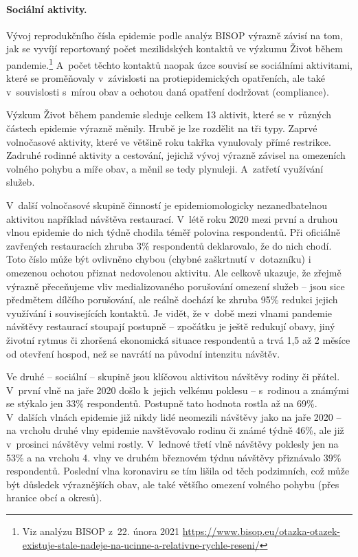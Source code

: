 \label{Socialni_aktivity}

\paragraph{Sociální aktivity.} Vývoj reprodukčního čísla epidemie podle analýz BISOP výrazně závisí na tom, jak se vyvíjí reportovaný počet mezilidských kontaktů ve výzkumu Život během pandemie.\footnote{Viz analýzu BISOP z 22. února 2021
\url{https://www.bisop.eu/otazka-otazek-existuje-stale-nadeje-na-ucinne-a-relativne-rychle-reseni/}} A~počet těchto kontaktů naopak úzce souvisí se sociálními aktivitami, které se proměňovaly v závislosti na protiepidemických opatřeních, ale také v~souvislosti s~mírou obav a ochotou daná opatření dodržovat (compliance).

Výzkum Život během pandemie sleduje celkem 13 aktivit, které se v~různých částech epidemie výrazně měnily. Hrubě je lze rozdělit na tři typy. Zaprvé volnočasové aktivity, které ve většině roku takřka vynulovaly přímé restrikce. Zadruhé rodinné aktivity a cestování, jejichž vývoj výrazně závisel na omezeních volného pohybu a míře obav, a měnil se tedy plynuleji. A~zatřetí využívání služeb.

V~další volnočasové skupině činností je epidemiomologicky nezanedbatelnou aktivitou například návštěva restaurací. V~létě roku 2020 mezi první a druhou vlnou epidemie do nich týdně chodila téměř polovina respondentů. Při oficiálně zavřených restauracích zhruba 3\% respondentů deklarovalo, že do nich chodí. Toto číslo může být ovlivněno chybou (chybné zaškrtnutí v~dotazníku) i omezenou ochotou přiznat nedovolenou aktivitu. Ale celkově ukazuje, že zřejmě výrazně přeceňujeme vliv medializovaného porušování omezení služeb – jsou sice předmětem dílčího porušování, ale reálně dochází ke zhruba 95\% redukci jejich využívání i souvisejících kontaktů. Je vidět, že v~době mezi vlnami pandemie návštěvy restaurací stoupají postupně – zpočátku je ještě redukují obavy, jiný životní rytmus či zhoršená ekonomická situace respondentů a trvá 1,5 až 2 měsíce od otevření hospod, než se navrátí na původní intenzitu návštěv.

Ve druhé – sociální – skupině jsou klíčovou aktivitou návštěvy rodiny či přátel. V~první vlně na jaře 2020 došlo k~jejich velkému poklesu – s~rodinou a známými se stýkalo jen 33\% respondentů. Postupně tato hodnota rostla až na 69\%. V dalších vlnách epidemie
již nikdy lidé neomezili návštěvy jako na jaře 2020 – na vrcholu druhé vlny epidemie navštěvovalo rodinu či známé týdně 46\%, ale již v~prosinci návštěvy velmi rostly. V~lednové třetí vlně návštěvy poklesly jen na 53\% a na vrcholu 4. vlny ve druhém březnovém týdnu návštěvy přiznávalo 39\% respondentů. Poslední vlna koronaviru se tím lišila od těch podzimních, což může být důsledek výraznějších obav, ale také většího omezení volného pohybu (přes hranice obcí a okresů).

